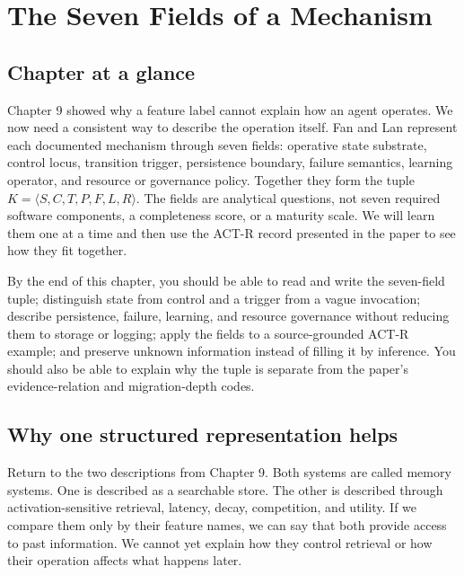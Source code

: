 \chapter{The Seven Fields of a Mechanism}
\label{ch:seven-fields-mechanism}

\section*{Chapter at a glance}
{}

Chapter 9 showed why a feature label cannot explain how an agent operates. We now need a consistent way to describe the operation itself. Fan and Lan represent each documented mechanism through seven fields: operative state substrate, control locus, transition trigger, persistence boundary, failure semantics, learning operator, and resource or governance policy. Together they form the tuple \(K = \langle S,C,T,P,F,L,R\rangle\). The fields are analytical questions, not seven required software components, a completeness score, or a maturity scale. We will learn them one at a time and then use the ACT-R record presented in the paper to see how they fit together.

\begin{learningbox}
By the end of this chapter, you should be able to read and write the seven-field tuple; distinguish state from control and a trigger from a vague invocation; describe persistence, failure, learning, and resource governance without reducing them to storage or logging; apply the fields to a source-grounded ACT-R example; and preserve unknown information instead of filling it by inference. You should also be able to explain why the tuple is separate from the paper's evidence-relation and migration-depth codes.
\end{learningbox}

\section{Why one structured representation helps}
\label{sec:seven-fields-why}

Return to the two descriptions from Chapter 9. Both systems are called memory systems. One is described as a searchable store. The other is described through activation-sensitive retrieval, latency, decay, competition, and utility. If we compare them only by their feature names, we can say that both provide access to past information. We cannot yet explain how they control retrieval or how their operation affects what happens later.

